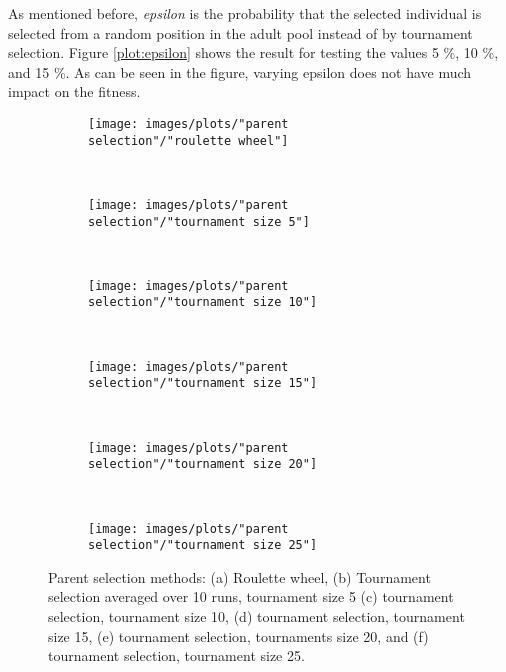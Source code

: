 \noindent As mentioned before, \textit{epsilon} is the probability that the selected individual is selected from a random position in the adult pool instead of by tournament selection. Figure \ref{plot:epsilon} shows the result for testing the values 5 \%, 10 \%, and 15 \%. As can be seen in the figure, varying epsilon does not have much impact on the fitness.\\


\begin{figure}[h!]
    \centering
    \begin{subfigure}[b]{0.31\textwidth}
        \texttt{[image: images/plots/"parent selection"/"roulette wheel"]}
        \caption{}
        \hfill
        \label{plot:roulette wheel}
    \end{subfigure}
    ~
    \begin{subfigure}[b]{0.31\textwidth}
        \texttt{[image: images/plots/"parent selection"/"tournament size 5"]}
        \caption{}
        \hfill
        \label{plot:tournament size 5}
    \end{subfigure}
    ~
       \begin{subfigure}[b]{0.31\textwidth}
        \texttt{[image: images/plots/"parent selection"/"tournament size 10"]}
        \caption{}
        \hfill
        \label{plot:tournament size 10}
    \end{subfigure}
    ~
       \begin{subfigure}[b]{0.31\textwidth}
        \texttt{[image: images/plots/"parent selection"/"tournament size 15"]}
        \caption{}
        \hfill
        \label{plot:tournament size 15}
    \end{subfigure}
    ~
       \begin{subfigure}[b]{0.31\textwidth}
        \texttt{[image: images/plots/"parent selection"/"tournament size 20"]}
        \caption{}
        \hfill
        \label{plot:tournament size 20}
    \end{subfigure}
    ~
    \begin{subfigure}[b]{0.31\textwidth}
        \texttt{[image: images/plots/"parent selection"/"tournament size 25"]}
        \caption{}
        \hfill
        \label{plot:tournament size 25}
    \end{subfigure}
    \caption{Parent selection methods: (a) Roulette wheel, (b) Tournament selection averaged over 10 runs, tournament size 5 (c) tournament selection, tournament size 10, (d) tournament selection, tournament size 15, (e) tournament selection, tournaments size 20, and (f) tournament selection, tournament size 25.}
    \label{plot:parent selection}
\end{figure}


